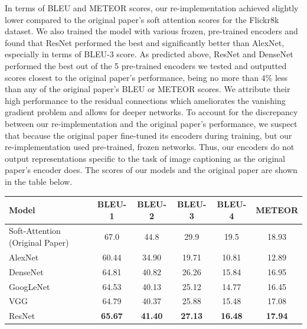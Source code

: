 \documentclass{article}
\begin{document}

In terms of BLEU and METEOR scores, our re-implementation achieved slightly lower compared to the original paper's soft attention scores for the Flickr8k dataset. We also trained the model with various frozen, pre-trained encoders and found that ResNet performed the best and significantly better than AlexNet, especially in terms of BLEU-3 score. As predicted above, ResNet and DenseNet performed the best out of the 5 pre-trained encoders we tested and outputted scores closest to the original paper's performance, being no more than 4\% less than any of the original paper's BLEU or METEOR scores. We attribute their high performance to the residual connections which ameliorates the vanishing gradient problem and allows for deeper networks. To account for the discrepancy between our re-implementation and the original paper's performance, we suspect that because the original paper fine-tuned its encoders during training, but our re-implementation used pre-trained, frozen networks. Thus, our encoders do not output representations specific to the task of image captioning as the original paper's encoder does. The scores of our models and the original paper are shown in the table below.

\begin{table}[h]
\centering
\begin{adjustbox}{width=.75\textwidth}
\small
\begin{tabular}{lccccc}
\toprule
Model & BLEU-1 & BLEU-2 & BLEU-3 & BLEU-4 & METEOR \\
\midrule
Soft-Attention (Original Paper) & 67.0 & 44.8 & 29.9 & 19.5 & 18.93 \\
AlexNet                & 60.44 & 34.90 & 19.71 & 10.81 & 12.89 \\
DenseNet               & 64.81 & 40.82 & 26.26 & 15.84 & 16.95 \\
GoogLeNet              & 64.53 & 40.13 & 25.12 & 14.77 & 16.45 \\
VGG                    & 64.79 & 40.37 & 25.88 & 15.48 & 17.08 \\
ResNet                 & \textbf{65.67} & \textbf{41.40} & \textbf{27.13} & \textbf{16.48} & \textbf{17.94} \\
\bottomrule
\end{tabular}
\end{adjustbox}
\end{table}
\end{document}
